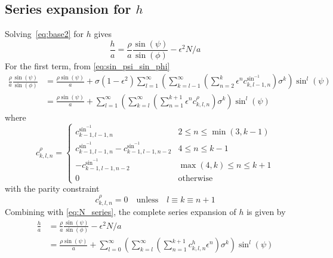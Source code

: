 \documentclass[a4paper]{amsart}
\begin{document}
\subsection{Series expansion for \texorpdfstring{$h$}{h}}
Solving~\eqref{eq:base2} for $h$ gives
\begin{equation*}
\frac{h}{a}=\frac{\rho}{a}\frac{\sin(\psi)}{\sin(\phi)}-\epsilon^2N/a
\end{equation*}
%
For the first term, from \eqref{eq:sin_psi_sin_phi}
\begin{align*}
\frac{\rho}{a}\frac{\sin(\psi)}{\sin(\phi)}&=\frac{\rho\sin(\psi)}{a}+\sigma(1 - \epsilon^2)\sum_{l=1}^\infty\left(\sum_{k=l-1}^\infty\left(\sum_{n=2}^k\epsilon^nc^{\sin^{-1}}_{k,l-1,n}\right)\sigma^k\right)\sin^l(\psi)\\
&=\frac{\rho\sin(\psi)}{a}+\sum_{l=1}^\infty\left(\sum_{k=l}^\infty\left(\sum_{n=1}^{k+1}\epsilon^nc^\rho_{k,l,n}\right)\sigma^{k}\right)\sin^l(\psi)
\end{align*}
where
\begin{equation*}
c^\rho_{k,l,n}=
\begin{cases}
c^{\sin^{-1}}_{k-1,l-1,n} & 2\leq n\leq \min(3, k-1)\\
c^{\sin^{-1}}_{k-1,l-1,n} - c^{\sin^{-1}}_{k-1,l-1,n-2} & 4\leq n\leq k-1\\
-c^{\sin^{-1}}_{k-1,l-1,n-2} & \max(4,k) \leq n\leq k+1\\
0 & \text{otherwise}
\end{cases}
\end{equation*}
with the parity constraint
\begin{equation*}
c^\rho_{k,l,n}=0\quad\text{unless}\quad l\equiv k\equiv n+1
\end{equation*}
%
Combining with \eqref{eq:N_series}, the complete series expansion of $h$ is given by
\begin{align*}
\frac{h}{a}&=\frac{\rho}{a}\frac{\sin(\psi)}{\sin(\phi)}-\epsilon^2N/a\\
&=\frac{\rho\sin(\psi)}{a}+\sum_{l=0}^\infty\left(\sum_{k=l}^\infty\left(\sum_{n=1}^{k+1}c^h_{k,l,n}\epsilon^n\right)\sigma^{k}\right)\sin^l(\psi)
\end{align*}
\end{document}
